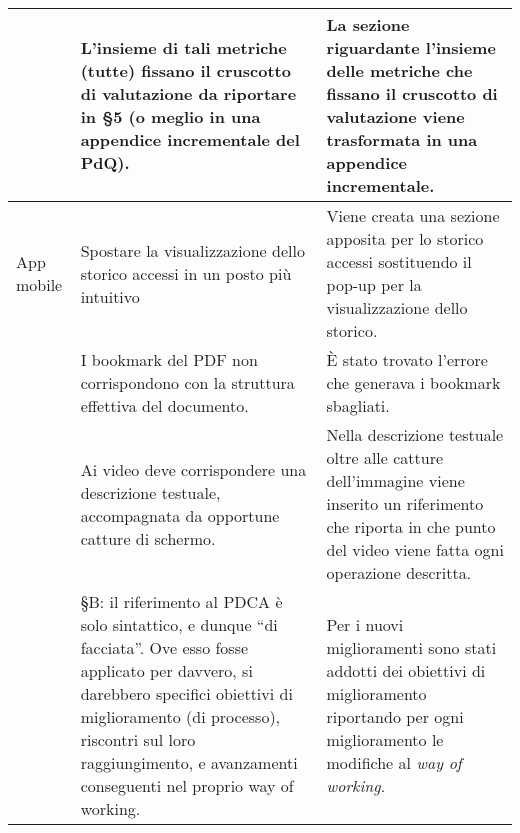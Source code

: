 {\begin{longtable}{ C{2.2cm} C{6cm} C{6cm}}
		\PdQ &  L’insieme di tali metriche (tutte) fissano il cruscotto di valutazione da riportare in §5 (o meglio in una appendice incrementale del PdQ). & La sezione riguardante l'insieme delle metriche che fissano il cruscotto di valutazione viene trasformata in una appendice incrementale.\\
		
		\hline
		
		App mobile & Spostare la visualizzazione dello storico accessi in un posto più intuitivo & Viene creata una sezione apposita per lo storico accessi sostituendo il pop-up per la visualizzazione dello storico.\\
		
		\NdP & I bookmark del PDF non corrispondono con la struttura effettiva del
		documento. & È stato trovato l'errore che generava i bookmark sbagliati.\\
		
		\MU & Ai video deve corrispondere una descrizione testuale, accompagnata da opportune catture di schermo. & Nella descrizione testuale oltre alle catture dell'immagine viene inserito un riferimento che riporta in che punto del video viene fatta ogni operazione descritta.\\
		
		\PdQ &  §B: il riferimento al PDCA è solo sintattico, e dunque “di facciata”. Ove esso fosse applicato per davvero, si darebbero specifici obiettivi di miglioramento (di processo), riscontri sul loro raggiungimento, e avanzamenti conseguenti nel proprio way of working. & Per i nuovi miglioramenti sono stati addotti dei obiettivi di miglioramento riportando per ogni miglioramento le modifiche al \textsl{way of working}.\\
		
	\end{longtable}
}

